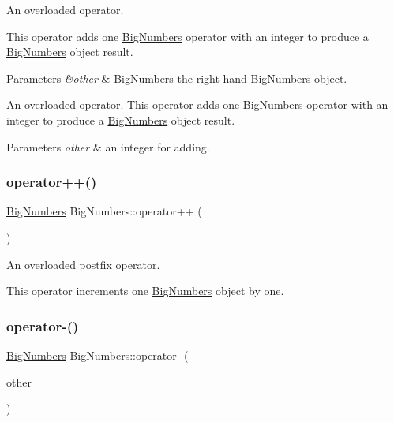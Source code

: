 An overloaded operator. 

This operator adds one \mbox{\hyperlink{class_big_numbers}{Big\+Numbers}} operator with an integer to produce a \mbox{\hyperlink{class_big_numbers}{Big\+Numbers}} object result. 
\begin{DoxyParams}{Parameters}
{\em \&other} & \mbox{\hyperlink{class_big_numbers}{Big\+Numbers}} the right hand \mbox{\hyperlink{class_big_numbers}{Big\+Numbers}} object.\\
\hline
\end{DoxyParams}
An overloaded operator. This operator adds one \mbox{\hyperlink{class_big_numbers}{Big\+Numbers}} operator with an integer to produce a \mbox{\hyperlink{class_big_numbers}{Big\+Numbers}} object result. 
\begin{DoxyParams}{Parameters}
{\em other} & an integer for adding. \\
\hline
\end{DoxyParams}
\mbox{\label{class_big_numbers_ae1c896592285a27d67259837eaf582de}} 
\subsubsection{\texorpdfstring{operator++()}{operator++()}}
{\footnotesize\ttfamily \mbox{\hyperlink{class_big_numbers}{Big\+Numbers}} Big\+Numbers\+::operator++ (\begin{DoxyParamCaption}{ }\end{DoxyParamCaption})}



An overloaded postfix operator. 

This operator increments one \mbox{\hyperlink{class_big_numbers}{Big\+Numbers}} object by one. \mbox{\label{class_big_numbers_a497890bdf8b229213c617574c0cf2146}} 
\subsubsection{\texorpdfstring{operator-\/()}{operator-()}\hspace{0.1cm}{\footnotesize\ttfamily [1/2]}}
{\footnotesize\ttfamily \mbox{\hyperlink{class_big_numbers}{Big\+Numbers}} Big\+Numbers\+::operator-\/ (\begin{DoxyParamCaption}\item[{\mbox{\hyperlink{class_big_numbers}{Big\+Numbers}} \&}]{other }\end{DoxyParamCaption})}



